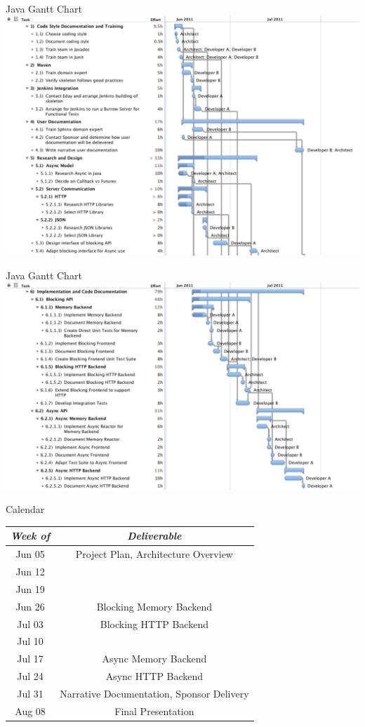 \documentclass{beamer}
\begin{document}
\begin{frame}{Java Gantt Chart}
  \includegraphics[width=0.95\linewidth]{Java-Gantt-P1.pdf}
\end{frame}

\begin{frame}{Java Gantt Chart}
  \includegraphics[width=0.95\linewidth]{Java-Gantt-P2.pdf}
\end{frame}

\begin{frame}{Calendar}
  \begin{center}
    \begin{tabular}{|c|c|}
      \hline
      \emph{Week of} & \emph{Deliverable}\\ \hline \hline
      Jun 05 & Project Plan, Architecture Overview\\ \hline
      Jun 12 & \\ \hline
      Jun 19 & \\ \hline
      Jun 26 & Blocking Memory Backend\\ \hline
      Jul 03 & Blocking HTTP Backend\\ \hline
      Jul 10 & \\ \hline
      Jul 17 & Async Memory Backend\\ \hline
      Jul 24 & Async HTTP Backend\\ \hline
      Jul 31 & Narrative Documentation, Sponsor Delivery\\\hline
      Aug 08 & Final Presentation\\ \hline
    \end{tabular}
    \end{center}
\end{frame}
\end{document}
